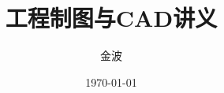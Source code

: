 \documentclass[12pt,twoside]{book}
\begin{document}
\begin{CJK}{UTF8}{song}

\title{工程制图与CAD讲义}
\author{金波}
\date{\today}
\maketitle
\CJKtilde
\frontmatter
\tableofcontents
\mainmatter
\graphicspath{{cad/pdf/}{cad/png/}}







\backmatter
\printindex

\newpage
\end{CJK}
\end{document}
